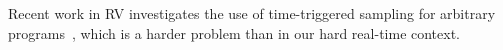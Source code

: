 Recent work in RV investigates the use of time-triggered sampling for arbitrary
programs~\cite{sampling,borzoo,rv11stoller}, which is a harder problem than in our hard
real-time context.

